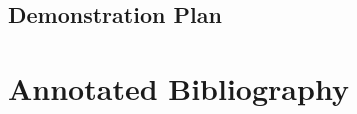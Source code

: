 \documentclass[11pt,fleqn,twoside]{article}
\begin{document}
\subsection{Demonstration Plan}

\section*{Annotated Bibliography}




\renewcommand{\refname}{}  %
\end{document}

